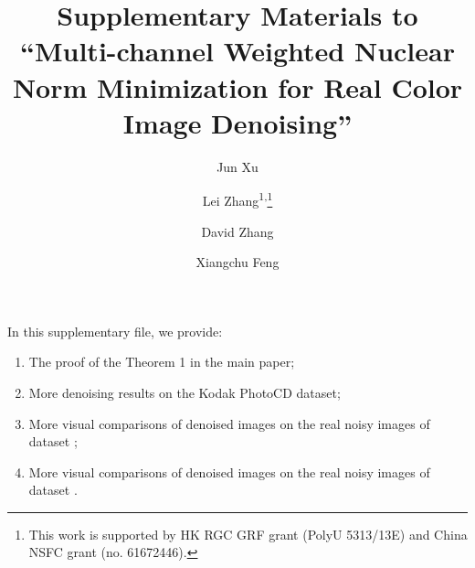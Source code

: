 \documentclass[10pt,onecolumn,letterpaper]{article}
\begin{document}
 

\title{Supplementary Materials to ``Multi-channel Weighted Nuclear Norm Minimization for Real Color Image Denoising''}
\vspace{-4mm}
\author[1]{Jun Xu}
\author[\empty]{Lei Zhang\textsuperscript{1,}\thanks{This work is supported by HK RGC GRF grant (PolyU 5313/13E) and China NSFC grant (no. 61672446).}}
\author[1]{David Zhang}
\author[2]{Xiangchu Feng}
\vspace{-4mm}

\maketitle
\vspace{-4mm}


In this supplementary file, we provide:\vspace{-2mm}
\begin{enumerate}
\item The proof of the Theorem 1 in the main paper;
\vspace{-2mm}
\item More denoising results on the Kodak PhotoCD dataset;
\vspace{-2mm}
\item More visual comparisons of denoised images on the real noisy images of dataset \cite{ncwebsite}; 
\vspace{-2mm}
\item More visual comparisons of denoised images on the real noisy images of dataset \cite{crosschannel2016}.
\end{enumerate}
\end{document}
